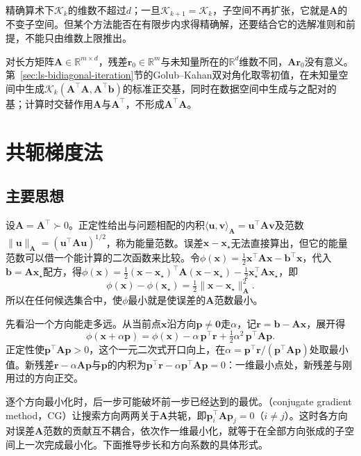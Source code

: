 精确算术下$\mathcal K_k$的维数不超过$d$；一旦$\mathcal K_{k+1}=\mathcal K_k$，子空间不再扩张，它就是$\bm A$的不变子空间。但某个方法能否在有限步内求得精确解，还要结合它的选解准则和前提，不能只由维数上限推出。

对长方矩阵$\bm A\in\mathbb R^{m\times d}$，残差$\bm r_0\in\mathbb R^m$与未知量所在的$\mathbb R^d$维数不同，$\bm A\bm r_0$没有意义。第~\ref{sec:ls-bidiagonal-iteration}节的Golub--Kahan双对角化取零初值，在未知量空间中生成$\mathcal K_k(\bm A^\top\bm A,\bm A^\top\bm b)$的标准正交基，同时在数据空间中生成与之配对的基；计算时交替作用$\bm A$与$\bm A^\top$，不形成$\bm A^\top\bm A$。

\section{共轭梯度法}
\label{sec:ls-conjugate-gradient}

\subsection{主要思想}

设$\bm A=\bm A^\top\succ0$。正定性给出与问题相配的内积$\langle\bm u,\bm v\rangle_{\bm A}=\bm u^\top\bm A\bm v$及范数$\lVert\bm u\rVert_{\bm A}=(\bm u^\top\bm A\bm u)^{1/2}$，称为能量范数。误差$\bm x-\bm x_\star$无法直接算出，但它的能量范数可以借一个能计算的二次函数来比较。令$\phi(\bm x)=\tfrac12\bm x^\top\bm A\bm x-\bm b^\top\bm x$，代入$\bm b=\bm A\bm x_\star$配方，得$\phi(\bm x)=\tfrac12(\bm x-\bm x_\star)^\top\bm A(\bm x-\bm x_\star)-\tfrac12\bm x_\star^\top\bm A\bm x_\star$，即
\[
 \phi(\bm x)-\phi(\bm x_\star)=\tfrac12\lVert\bm x-\bm x_\star\rVert_{\bm A}^2 .
\]
所以在任何候选集合中，使$\phi$最小就是使误差的$\bm A$范数最小。

先看沿一个方向能走多远。从当前点$\bm x$沿方向$\bm p\ne\bm0$走$\alpha$，记$\bm r=\bm b-\bm A\bm x$，展开得
\[
 \phi(\bm x+\alpha\bm p)=\phi(\bm x)-\alpha\,\bm p^\top\bm r+\tfrac12\alpha^2\,\bm p^\top\bm A\bm p .
\]
正定性使$\bm p^\top\bm A\bm p>0$，这个一元二次式开口向上，在$\alpha=\bm p^\top\bm r/(\bm p^\top\bm A\bm p)$处取最小值。新残差$\bm r-\alpha\bm A\bm p$与$\bm p$的内积为$\bm p^\top\bm r-\alpha\bm p^\top\bm A\bm p=0$：一维最小点处，新残差与刚用过的方向正交。

逐个方向最小化时，后一步可能破坏前一步已经达到的最优。（conjugate gradient method，CG）让搜索方向两两关于$\bm A$共轭，即$\bm p_i^\top\bm A\bm p_j=0$（$i\ne j$）。这时各方向对误差$\bm A$范数的贡献互不耦合，依次作一维最小化，就等于在全部方向张成的子空间上一次完成最小化。下面推导步长和方向系数的具体形式。

